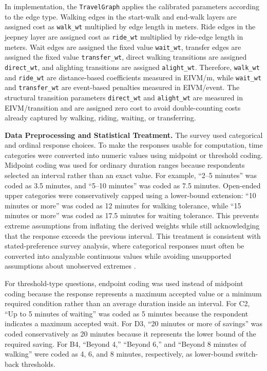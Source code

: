 {In implementation, the \texttt{TravelGraph} applies the calibrated parameters according to the edge type. Walking edges in the start-walk and end-walk layers are assigned cost as \texttt{walk\_wt} multiplied by edge length in meters. Ride edges in the jeepney layer are assigned cost as \texttt{ride\_wt} multiplied by ride-edge length in meters. Wait edges are assigned the fixed value \texttt{wait\_wt}, transfer edges are assigned the fixed value \texttt{transfer\_wt}, direct walking transitions are assigned \texttt{direct\_wt}, and alighting transitions are assigned \texttt{alight\_wt}. Therefore, \texttt{walk\_wt} and \texttt{ride\_wt} are distance-based coefficients measured in \ac{EIVM}/m, while \texttt{wait\_wt} and \texttt{transfer\_wt} are event-based penalties measured in \ac{EIVM}/event. The structural transition parameters \texttt{direct\_wt} and \texttt{alight\_wt} are measured in \ac{EIVM}/transition and are assigned zero cost to avoid double-counting costs already captured by walking, riding, waiting, or transferring.

\noindent\textbf{Data Preprocessing and Statistical Treatment.}
The survey used categorical and ordinal response choices. To make the responses usable for computation, time categories were converted into numeric values using midpoint or threshold coding. Midpoint coding was used for ordinary duration ranges because respondents selected an interval rather than an exact value. For example, ``2--5 minutes'' was coded as 3.5 minutes, and ``5--10 minutes'' was coded as 7.5 minutes. Open-ended upper categories were conservatively capped using a lower-bound extension: ``10 minutes or more'' was coded as 12 minutes for walking tolerance, while ``15 minutes or more'' was coded as 17.5 minutes for waiting tolerance. This prevents extreme assumptions from inflating the derived weights while still acknowledging that the response exceeds the previous interval. This treatment is consistent with stated-preference survey analysis, where categorical responses must often be converted into analyzable continuous values while avoiding unsupported assumptions about unobserved extremes \cite{hensher2015applied}.

For threshold-type questions, endpoint coding was used instead of midpoint coding because the response represents a maximum accepted value or a minimum required condition rather than an average duration inside an interval. For C2, ``Up to 5 minutes of waiting'' was coded as 5 minutes because the respondent indicates a maximum accepted wait. For D3, ``20 minutes or more of savings'' was coded conservatively as 20 minutes because it represents the lower bound of the required saving. For B4, ``Beyond 4,'' ``Beyond 6,'' and ``Beyond 8 minutes of walking'' were coded as 4, 6, and 8 minutes, respectively, as lower-bound switch-back thresholds.

}
